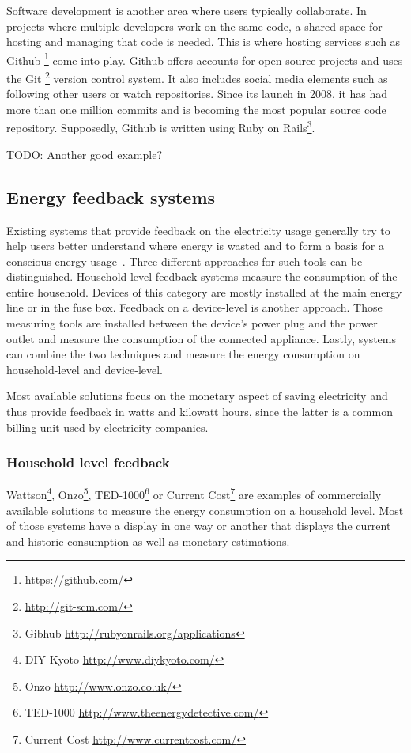 Software development is another area where users typically collaborate. In projects where multiple developers work on the same code, a shared space for hosting and managing that code is needed. This is where hosting services such as Github \footnote{\url{https://github.com/}} come into play. Github offers accounts for open source projects and uses the Git \footnote{\url{http://git-scm.com/}} version control system. It also includes social media elements such as following other users or watch repositories. Since its launch in 2008, it has had more than one million commits and is becoming the most popular source code repository\cite{inquirer_github}.
Supposedly, Github is written using Ruby on Rails\footnote{Gibhub \url{http://rubyonrails.org/applications}}.

TODO: Another good example?

\subsection{Energy feedback systems}
Existing systems that provide feedback on the electricity usage generally try to help users better understand where energy is wasted and to form a basis for a conscious energy usage~\cite{mattern:inproc:2010}. Three different approaches for such tools can be distinguished. Household-level feedback systems  measure the consumption of the entire household. Devices of this category are mostly installed at the main energy line or in the fuse box. Feedback on a device-level is another approach. Those measuring tools are installed between the device's power plug and the power outlet and measure the consumption of the connected appliance. Lastly, systems can combine the two techniques and measure the energy consumption on household-level and device-level.

Most available solutions focus on the monetary aspect of saving electricity and thus provide feedback in watts and kilowatt hours, since the latter is a common billing unit used by electricity companies. 

\subsubsection{Household level feedback}
Wattson\footnote{DIY Kyoto \url{http://www.diykyoto.com/}}, Onzo\footnote{Onzo \url{http://www.onzo.co.uk/}}, TED-1000\footnote{
TED-1000 \url{http://www.theenergydetective.com/}} or Current Cost\footnote{Current Cost \url{http://www.currentcost.com/}} are examples of commercially available solutions to measure the energy consumption on a household level.  Most of those systems have a display in one way or another that displays the current and historic consumption as well as monetary estimations.  

